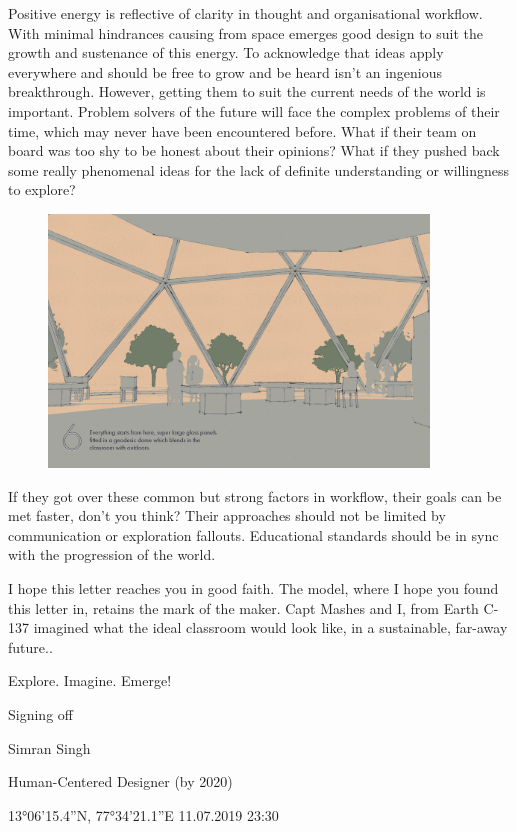 \documentclass[a4paper,7pt]{article}
\begin{document}
Positive energy is reflective of clarity in thought and organisational workflow. With minimal hindrances causing from space emerges good design to suit the growth and sustenance of this energy. To acknowledge that ideas apply everywhere and should be free to grow and be heard isn’t an ingenious breakthrough. However, getting them to suit the current needs of the world is important. Problem solvers of the future will face the complex problems of their time, which may never have been encountered before. What if their team on board was too shy to be honest about their opinions? What if they pushed back some really phenomenal ideas for the lack of definite understanding or willingness to explore?

\begin{figure}[h]
  \center
  \includegraphics[width=0.9\textwidth]{discoverdrome_6.png}
\end{figure}

If they got over these common but strong factors in workflow, their goals can be met faster, don’t you think? Their approaches should not be limited by communication or exploration fallouts. Educational standards should be in sync with the progression of the world. 

I hope this letter reaches you in good faith. The model, where I hope you found this letter in, retains the mark of the maker. Capt Mashes and I, from Earth C-137 imagined what the ideal classroom would look like, in a sustainable, far-away future..

Explore. Imagine. Emerge!

Signing off

Simran Singh

Human-Centered Designer (by 2020)

\ang{13}06'15.4''N, \ang{77}34'21.1''E \hspace{0.2cm} 11.07.2019 \hspace{0.2cm} 23:30
\end{document}
